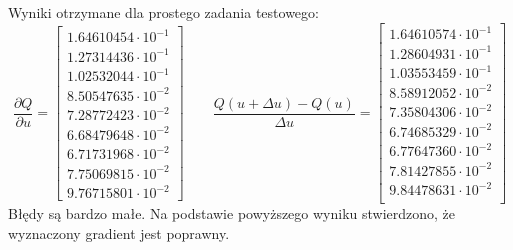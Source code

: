 Wyniki otrzymane dla prostego zadania testowego:
\begin{equation}
\frac{\partial Q}{\partial u}=
\begin{bmatrix}
1.64610454\cdot 10^{-1}\\
1.27314436\cdot 10^{-1}\\
1.02532044\cdot 10^{-1}\\
8.50547635\cdot 10^{-2}\\
7.28772423\cdot 10^{-2}\\
6.68479648\cdot 10^{-2}\\
6.71731968\cdot 10^{-2}\\
7.75069815\cdot 10^{-2}\\
9.76715801\cdot 10^{-2}
\end{bmatrix}
\qquad
\frac{Q(u+\Delta u)-Q(u)}{\Delta u}=
\begin{bmatrix}
1.64610574\cdot 10^{-1}\\
1.28604931\cdot 10^{-1}\\
1.03553459\cdot 10^{-1}\\
8.58912052\cdot 10^{-2}\\
7.35804306\cdot 10^{-2}\\
6.74685329\cdot 10^{-2}\\
6.77647360\cdot 10^{-2}\\
7.81427855\cdot 10^{-2}\\
9.84478631\cdot 10^{-2}\\
\end{bmatrix}
\end{equation}
Błędy są bardzo małe. Na podstawie powyższego wyniku stwierdzono, że wyznaczony gradient jest poprawny.